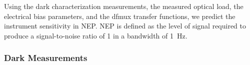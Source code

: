 Using the dark characterization measurements, the measured optical load, the electrical bias parameters, and the dfmux transfer functions, we predict the instrument sensitivity in \ac{NEP}. 
\ac{NEP} is defined as the level of signal required to produce a signal-to-noise ratio of 1 in a bandwidth of 1~Hz.  

\subsubsection{Dark Measurements}
\label{sec:dark_measurements}






